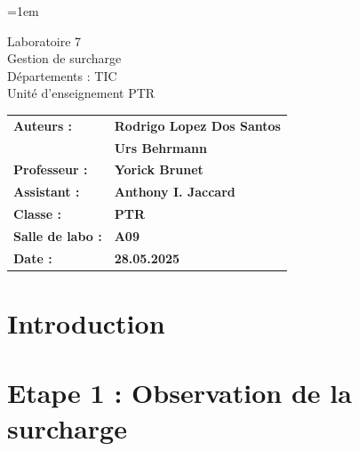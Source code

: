 \documentclass[a4paper,12pt]{article}
\author{Urs Behrmann}
\begin{document}
\emergencystretch=1em %

\thispagestyle{firstpage}


\vspace*{2cm}
\begin{center}
    \Huge Laboratoire 7 \\
    \vspace{0.2cm}
    \Large Gestion de surcharge\\
    \vspace{1cm}
    \small Départements : TIC\\
    Unité d'enseignement PTR\\
\end{center}

\vspace{9cm}

\renewcommand{\arraystretch}{1.5} %

\begin{flushleft} %
    \begin{tabular}{@{}l l@{}}
        \textbf{Auteurs :}       & \textbf{Rodrigo Lopez Dos Santos} \\
                                 & \textbf{Urs Behrmann} \\
        \textbf{Professeur :}    & \textbf{Yorick Brunet} \\
        \textbf{Assistant :}     & \textbf{Anthony I. Jaccard} \\
        \textbf{Classe :}        & \textbf{PTR} \\
        \textbf{Salle de labo :} & \textbf{A09} \\
        \textbf{Date :}          & \textbf{28.05.2025} 
    \end{tabular}
\end{flushleft}

\newpage

\pagestyle{otherpages}

\tableofcontents

\newpage

\section{Introduction}



\newpage

\section{Etape 1 : Observation de la surcharge}
\end{document}
